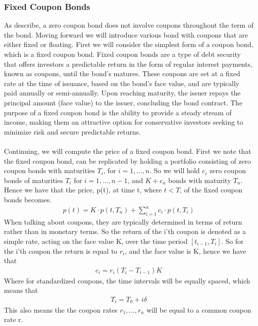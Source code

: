 \subsubsection{Fixed Coupon Bonds}
As describe, a zero coupon bond does not involve coupons throughout the term of the bond. 
Moving forward we will introduce various bond with coupons that are either fixed 
or floating. First we will consider the simplest form of a coupon bond, which is a 
fixed coupon bond. Fixed coupon bonds are a type of debt security that offers investors a predictable
return in the form of regular interest payments, known as coupons, until the bond's matures.
These coupons are set at a fixed rate at the time of issuance, based on the bond's face value,
and are typically paid annually or semi-annually. Upon reaching maturity, the issuer repays 
the principal amount (face value) to the issuer, concluding the bond contract. The purpose
of a fixed coupon bond is the ability to provide a steady stream of income,
making them an attractive option for conservative investors seeking to minimize risk and 
secure predictable returns.
\\\\
Continuing, we will compute the price of a fixed coupon bond. First we note that the fixed coupon bond,
can be replicated by holding a portfolio consisting of zero coupon bonds with maturities $T_i$, for 
$i=1,...,n$. So we will hold $c_i$ zero coupon bonds of maturities $T_i$ for $i=1,...,n-1$, and 
$K+c_n$ bonds with maturity $T_n$. Hence we have that the price, p(t), at time t, where $t<T$, of 
the fixed coupon bonds becomes. \cite{Bjork}
\begin{align*}
    p(t) = K \cdot p(t,T_n) + \sum_{i=1}^{n}c_i \cdot p(t,T_i)
\end{align*}
When talking about coupons, they are typically determined in terms of return rather than in monetary terms.
So the return of the i'th coupon is denoted as a simple rate, acting on the face value K, over the
time period $[t_{i-1},T_i]$. So for the i'th coupon the return is equal to $r_i$, and the face value 
is K, hence we have that 
\begin{align*}
    c_i = r_i(T_i-T_{i-1})K
\end{align*}
Where for standardized coupons, the time intervals will be equally spaced, which means that 
\begin{align*}
    T_i = T_0 + i \delta
\end{align*}
This also means the the coupon rates $r_1,...,r_n$ will be equal to a common coupon rate r. 
